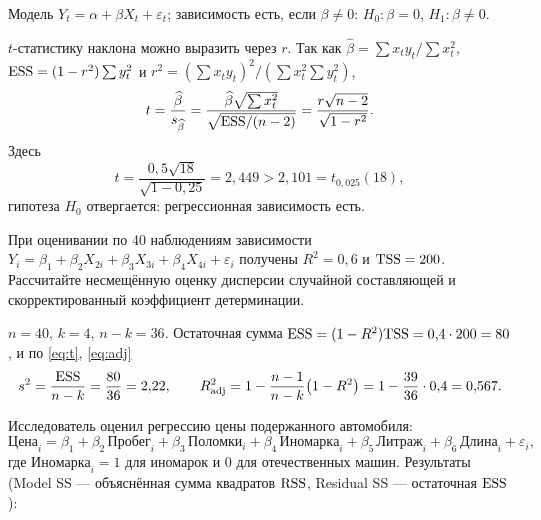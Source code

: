 \begin{solution}
Модель $Y_t = \alpha + \beta X_t + \varepsilon_t$; зависимость есть, если
$\beta \ne 0$: $H_0\colon \beta = 0$, $H_1\colon \beta \ne 0$.

$t$-статистику наклона можно выразить через $r$. Так как
$\widehat{\beta} = \sum x_ty_t/\sum x_t^2$, $\mathrm{ESS} = (1 - r^2)\sum y_t^2$ и
$r^2 = (\sum x_ty_t)^2/(\sum x_t^2\sum y_t^2)$,
\[
  t = \frac{\widehat{\beta}}{s_{\widehat{\beta}}}
    = \frac{\widehat{\beta}\sqrt{\sum x_t^2}}{\sqrt{\mathrm{ESS}/(n-2)}}
    = \frac{r\sqrt{n-2}}{\sqrt{1 - r^2}} .
\]
Здесь
\[
  t = \frac{0{,}5\sqrt{18}}{\sqrt{1 - 0{,}25}} = 2{,}449 > 2{,}101 = t_{0{,}025}(18),
\]
гипотеза $H_0$ отвергается: регрессионная зависимость есть.
\end{solution}


При оценивании по 40 наблюдениям зависимости
$Y_i = \beta_1 + \beta_2X_{2i} + \beta_3X_{3i} + \beta_4X_{4i} + \varepsilon_i$
получены $R^2 = 0{,}6$ и $\mathrm{TSS} = 200$. Рассчитайте несмещённую оценку
дисперсии случайной составляющей и скорректированный коэффициент
детерминации.

\begin{solution}
$n = 40$, $k = 4$, $n - k = 36$. Остаточная сумма
$\mathrm{ESS} = (1 - R^2)\mathrm{TSS} = 0{,}4\cdot 200 = 80$, и по \eqref{eq:t}, \eqref{eq:adj}
\[
  s^2 = \frac{\mathrm{ESS}}{n-k} = \frac{80}{36} = 2{,}22,
  \qquad
  R^2_{\text{adj}} = 1 - \frac{n-1}{n-k}\bigl(1 - R^2\bigr) = 1 - \frac{39}{36}\cdot 0{,}4 = 0{,}567 .
\]
\end{solution}


Исследователь оценил регрессию цены подержанного автомобиля:
\[
  \mathit{Цена}_i = \beta_1 + \beta_2\,\mathit{Пробег}_i + \beta_3\,\mathit{Поломки}_i
  + \beta_4\,\mathit{Иномарка}_i + \beta_5\,\mathit{Литраж}_i + \beta_6\,\mathit{Длина}_i
  + \varepsilon_i ,
\]
где $\mathit{Иномарка}_i = 1$ для иномарок и 0 для отечественных машин.
Результаты (Model SS — объяснённая сумма квадратов $\mathrm{RSS}$, Residual SS —
остаточная $\mathrm{ESS}$):

